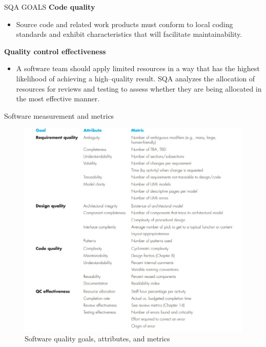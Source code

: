 \documentclass{beamer}
\begin{document}
\begin{frame}{SQA GOALS}
	\textbf{Code quality}
\begin{itemize}
	\item Source code and related work products must conform to local coding standards and exhibit characteristics that will facilitate maintainability.
\end{itemize}
\textbf{Quality control effectiveness}
\begin{itemize}
	\item A software team should apply limited resources in a way that has the highest likelihood of achieving a high–quality result. SQA analyzes the allocation of resources for reviews and testing to assess whether they are being allocated in the most effective manner.
\end{itemize}
\end{frame}
\begin{frame}{Software 
		measurement and metrics}
	\begin{figure}
	\includegraphics[scale=.4]{img/m5_2}
	\caption{Software quality goals, attributes, and metrics }
\end{figure}
\end{frame}
\end{document}
